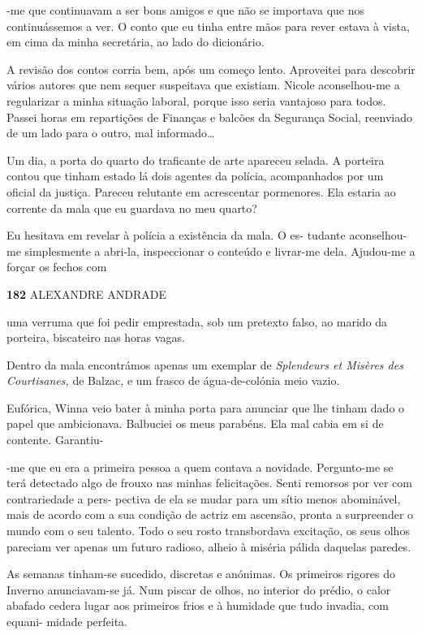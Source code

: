 -me que continuavam a ser bons amigos e que não se importava que nos
continuássemos a ver. O conto que eu tinha entre mãos para rever estava
à vista, em cima da minha secretária, ao lado do dicionário.

A revisão dos contos corria bem, após um começo lento. Aproveitei para
descobrir vários autores que nem sequer suspeitava que existiam. Nicole
aconselhou-me a regularizar a minha situação laboral, porque isso seria
vantajoso para todos. Passei horas em repartições de Finanças e balcões
da Segurança Social, reenviado de um lado para o outro, mal
informado\ldots{}

Um dia, a porta do quarto do traficante de arte apareceu selada. A
porteira contou que tinham estado lá dois agentes da polícia,
acompanhados por um oficial da justiça. Pareceu relutante em acrescentar
pormenores. Ela estaria ao corrente da mala que eu guardava no meu
quarto?

Eu hesitava em revelar à polícia a existência da mala. O es- tudante
aconselhou-me simplesmente a abri-la, inspeccionar o conteúdo e
livrar-me dela. Ajudou-me a forçar os fechos com

\textbf{182 }ALEXANDRE ANDRADE

uma verruma que foi pedir emprestada, sob um pretexto falso, ao marido
da porteira, biscateiro nas horas vagas.

Dentro da mala encontrámos apenas um exemplar de \emph{Splendeurs et
Misères des Courtisanes, }de Balzac, e um frasco de água-de-colónia meio
vazio.

Eufórica, Winna veio bater à minha porta para anunciar que lhe tinham
dado o papel que ambicionava. Balbuciei os meus parabéns. Ela mal cabia
em si de contente. Garantiu-

-me que eu era a primeira pessoa a quem contava a novidade. Pergunto-me
se terá detectado algo de frouxo nas minhas felicitações. Senti remorsos
por ver com contrariedade a pers- pectiva de ela se mudar para um sítio
menos abominável, mais de acordo com a sua condição de actriz em
ascensão, pronta a surpreender o mundo com o seu talento. Todo o seu
rosto transbordava excitação, os seus olhos pareciam ver apenas um
futuro radioso, alheio à miséria pálida daquelas paredes.

As semanas tinham-se sucedido, discretas e anónimas. Os primeiros
rigores do Inverno anunciavam-se já. Num piscar de olhos, no interior do
prédio, o calor abafado cedera lugar aos primeiros frios e à humidade
que tudo invadia, com equani- midade perfeita.

